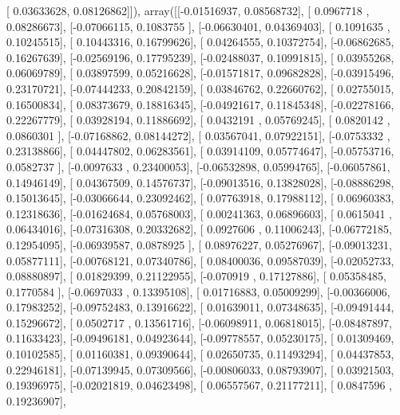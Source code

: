 \documentclass{article}
\begin{document}
       [ 0.03633628,  0.08126862]]), array([[-0.01516937,  0.08568732],
       [ 0.0967718 ,  0.08286673],
       [-0.07066115,  0.1083755 ],
       [-0.06630401,  0.04369403],
       [ 0.1091635 ,  0.10245515],
       [ 0.10443316,  0.16799626],
       [ 0.04264555,  0.10372754],
       [-0.06862685,  0.16267639],
       [-0.02569196,  0.17795239],
       [-0.02488037,  0.10991815],
       [ 0.03955268,  0.06069789],
       [ 0.03897599,  0.05216628],
       [-0.01571817,  0.09682828],
       [-0.03915496,  0.23170721],
       [-0.07444233,  0.20842159],
       [ 0.03846762,  0.22660762],
       [ 0.02755015,  0.16500834],
       [ 0.08373679,  0.18816345],
       [-0.04921617,  0.11845348],
       [-0.02278166,  0.22267779],
       [ 0.03928194,  0.11886692],
       [ 0.0432191 ,  0.05769245],
       [ 0.0820142 ,  0.0860301 ],
       [-0.07168862,  0.08144272],
       [ 0.03567041,  0.07922151],
       [-0.0753332 ,  0.23138866],
       [ 0.04447802,  0.06283561],
       [ 0.03914109,  0.05774647],
       [-0.05753716,  0.0582737 ],
       [-0.0097633 ,  0.23400053],
       [-0.06532898,  0.05994765],
       [-0.06057861,  0.14946149],
       [ 0.04367509,  0.14576737],
       [-0.09013516,  0.13828028],
       [-0.08886298,  0.15013645],
       [-0.03066644,  0.23092462],
       [ 0.07763918,  0.17988112],
       [ 0.06960383,  0.12318636],
       [-0.01624684,  0.05768003],
       [ 0.00241363,  0.06896603],
       [ 0.0615041 ,  0.06434016],
       [-0.07316308,  0.20332682],
       [ 0.0927606 ,  0.11006243],
       [-0.06772185,  0.12954095],
       [-0.06939587,  0.0878925 ],
       [ 0.08976227,  0.05276967],
       [-0.09013231,  0.05877111],
       [-0.00768121,  0.07340786],
       [ 0.08400036,  0.09587039],
       [-0.02052733,  0.08880897],
       [ 0.01829399,  0.21122955],
       [-0.070919  ,  0.17127886],
       [ 0.05358485,  0.1770584 ],
       [-0.0697033 ,  0.13395108],
       [ 0.01716883,  0.05009299],
       [-0.00366006,  0.17983252],
       [-0.09752483,  0.13916622],
       [ 0.01639011,  0.07348635],
       [-0.09491444,  0.15296672],
       [ 0.0502717 ,  0.13561716],
       [-0.06098911,  0.06818015],
       [-0.08487897,  0.11633423],
       [-0.09496181,  0.04923644],
       [-0.09778557,  0.05230175],
       [ 0.01309469,  0.10102585],
       [ 0.01160381,  0.09390644],
       [ 0.02650735,  0.11493294],
       [ 0.04437853,  0.22946181],
       [-0.07139945,  0.07309566],
       [-0.00806033,  0.08793907],
       [ 0.03921503,  0.19396975],
       [-0.02021819,  0.04623498],
       [ 0.06557567,  0.21177211],
       [ 0.0847596 ,  0.19236907],
\end{document}

